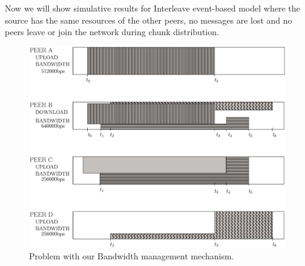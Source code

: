 Now we will show simulative results for Interleave event-based model where the source has the same resources of the other peers, no messages are lost and no peers leave or join the network during chunk distribution.
\begin{figure}[ht]
\centering
\includegraphics[width=\textwidth]{img/max-min-fairness-problem.eps}
\caption{Problem with our Bandwidth management mechanism.}
\label{max-min-fairness-problem}
\end{figure}

